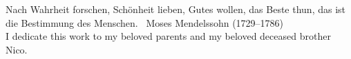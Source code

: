 \begin{titlepage}
    \sffamily
    \vspace*{\fill}
    \begingroup
    \centering
    \glqq%
    Nach Wahrheit forschen,
    Sch\"onheit lieben,
    Gutes wollen,
    das Beste thun,
    das ist die Bestimmung des Menschen.%
    \grqq
    \tiny{~Moses Mendelssohn (1729--1786)}\\
    \endgroup
    \vspace*{\fill}
    I dedicate this work to my beloved parents and my beloved deceased brother
    Nico. 
\end{titlepage}
\restoregeometry